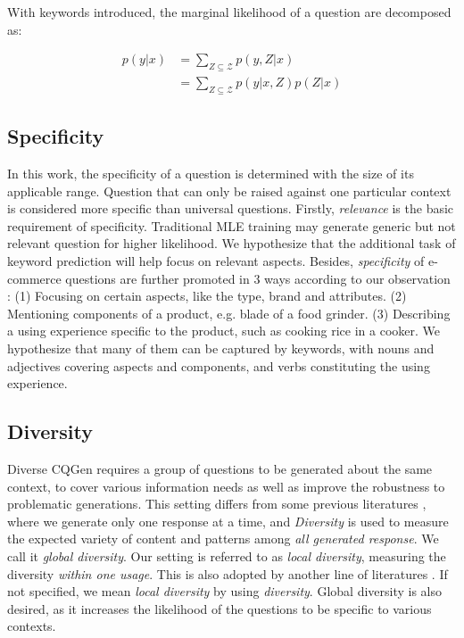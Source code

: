 \documentclass[letterpaper]{article} %
\begin{document}
With keywords introduced, the marginal likelihood of a question are decomposed as:

\begin{equation}
  \begin{split}
    p(y|x) &= \sum_{Z \subseteq \mathcal{Z}}p(y, Z|x) \\ 
    &= \sum_{Z \subseteq \mathcal{Z}}p(y|x,Z)p(Z|x)
  \end{split}
  \label{equ:decompose}
\end{equation}

\subsection{Specificity}
\label{sec:specific}
In this work, the specificity of a question is determined with the size of its applicable range. Question that can only be raised against one particular context is considered more specific than universal questions. Firstly, \textit{relevance} is the basic requirement of specificity. Traditional MLE training may generate generic but not relevant question for higher likelihood. We hypothesize that the additional task of keyword prediction will help focus on relevant aspects. Besides, \textit{specificity} of e-commerce questions are further promoted in 3 ways according to our observation : (1) Focusing on certain aspects, like the type, brand and attributes. (2) Mentioning components of a product, e.g. blade of a food grinder. (3) Describing a using experience specific to the product, such as cooking rice in a cooker. We hypothesize that many of them can be captured by keywords, with nouns and adjectives covering aspects and components, and verbs constituting the using experience.

\subsection{Diversity}

Diverse CQGen requires a group of questions to be generated about the same context, to cover various information needs as well as improve the robustness to problematic generations. This setting differs from some previous literatures \citep{wang2018learning, rao2019answer}, where we generate only one response at a time, and \textit{Diversity} is used to measure the expected variety of content and patterns among \textit{all generated response}. We call it \textit{global diversity}. Our setting is referred to as \textit{local diversity}, measuring the diversity \textit{within one usage}. This is also adopted by another line of literatures \citep{vijayakumar2018diverse, shen2019mixture}. If not specified, we mean \textit{local diversity} by using \textit{diversity}. Global diversity is also desired, as it increases the likelihood of the questions to be specific to various contexts. 
\end{document}
